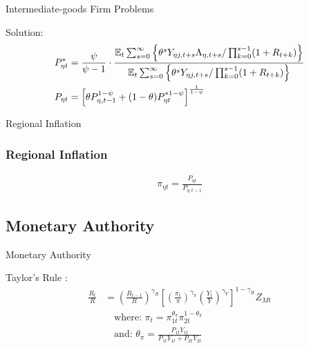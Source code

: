 \documentclass[../quali_slides.tex]{subfiles}
\begin{document}
\begin{frame}{Intermediate-goods Firm Problems}
	
	Solution:
	\begin{align}
		P_{\eta t}^{\ast} &= \frac{\psi}{\psi-1} \cdot \frac{{\mathbb{E}_{t}} \sum_{s=0}^{\infty} \left\{ \theta^s Y_{\eta j,t+s} \Lambda_{\eta, t+s} / \prod_{k=0}^{s-1}(1+R_{t+k}) \right\}}{{\mathbb{E}_{t}} \sum_{s=0}^{\infty} \left\{ \theta^s Y_{\eta j,t+s} / \prod_{k=0}^{s-1}(1+R_{t+k}) \right\}} \label{eq_v2:reg-int-good-firm-optimal-price-FOC-3} \\
		P_{\eta t} & = \left[ \theta P_{\eta, t-1}^{1-\psi} + (1-\theta) P_{\eta t}^{\ast 1-\psi} \right]^\frac{1}{1-\psi} \label{eq_v2:reg-general-price-level}
	\end{align}
	
\end{frame}



\begin{frame}{Regional Inflation}

\subsubsection{Regional Inflation}

\begin{align}
	\pi_{\eta t} = \frac{P_{\eta t}}{P_{\eta, t-1}} \label{eq_v2:reg-regional-inflation}
\end{align}

\end{frame}


\subsection{Monetary Authority}

\begin{frame}{Monetary Authority}
	
Taylor's Rule \cite{taylor_discretion_1993}:	
\begin{align}
	\frac{R_{t}}{R} &= \left( \frac{R_{t-1}}{R} \right)^{\gamma_{R}}  \left[\left( \frac{\pi_t}{\pi} \right)^{\gamma_{\pi}} \left( \frac{Y_{t}}{Y} \right)^{\gamma_{Y}} \right]^{1-\gamma_{R}} Z_{Mt} \label{eq_v2:reg-monetary-policy} \\
	&\quad \text{where: } \pi_{t} = \pi_{1t}^{\theta_{\pi}} \pi_{2t}^{1 - \theta_{\pi}} \label{eq_v2:reg-gross-inflation-rate} \\ 
	&\quad \text{and: } \theta_{\pi} = \frac{P_{1t} Y_{1t}}{P_{1t} Y_{1t} + P_{2t} Y_{2t}} \label{eq_v2:reg-theta-pi}
\end{align}
	
	
\end{frame}
\end{document}
